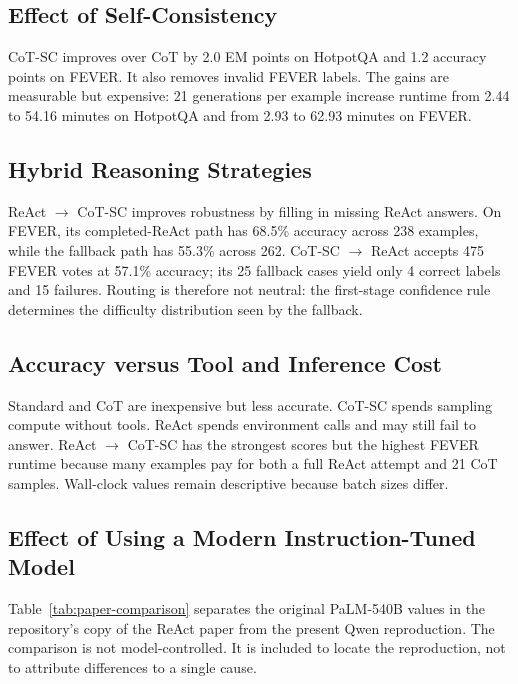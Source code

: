 \documentclass[10pt]{article}
\begin{document}
\subsection{Effect of Self-Consistency}

CoT-SC improves over CoT by 2.0 EM points on HotpotQA and 1.2 accuracy points on FEVER. It also removes invalid FEVER labels. The gains are measurable but expensive: 21 generations per example increase runtime from 2.44 to 54.16 minutes on HotpotQA and from 2.93 to 62.93 minutes on FEVER.

\subsection{Hybrid Reasoning Strategies}

ReAct $\rightarrow$ CoT-SC improves robustness by filling in missing ReAct answers. On FEVER, its completed-ReAct path has 68.5\% accuracy across 238 examples, while the fallback path has 55.3\% across 262. CoT-SC $\rightarrow$ ReAct accepts 475 FEVER votes at 57.1\% accuracy; its 25 fallback cases yield only 4 correct labels and 15 failures. Routing is therefore not neutral: the first-stage confidence rule determines the difficulty distribution seen by the fallback.

\subsection{Accuracy versus Tool and Inference Cost}

Standard and CoT are inexpensive but less accurate. CoT-SC spends sampling compute without tools. ReAct spends environment calls and may still fail to answer. ReAct $\rightarrow$ CoT-SC has the strongest scores but the highest FEVER runtime because many examples pay for both a full ReAct attempt and 21 CoT samples. Wall-clock values remain descriptive because batch sizes differ.

\subsection{Effect of Using a Modern Instruction-Tuned Model}

Table~\ref{tab:paper-comparison} separates the original PaLM-540B values in the repository's copy of the ReAct paper from the present Qwen reproduction. The comparison is not model-controlled. It is included to locate the reproduction, not to attribute differences to a single cause.
\end{document}
